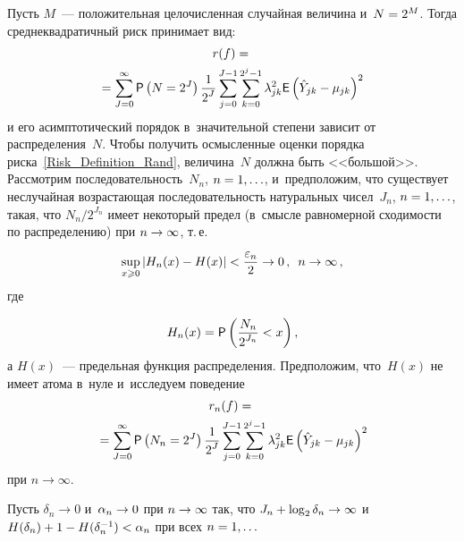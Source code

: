 \begin{multicols}{2}
Пусть $M$~--- положительная целочисленная случайная величина и~$N\hm=2^M$. 
Тогда среднеквадратичный риск принимает вид:
\begin{multline}
r(f)={}\\
\hspace*{-2mm}{}=\sum\limits_{J=0}^{\infty}{\sf P}\left(N=2^J\right)
\fr{1}{2^J}\sum\limits_{j=0}^{J-1}
\sumk\limits \lambda^2_{jk}{\sf E}\left(\hat{Y}_{jk}-\mujk\right)^2\!\!
\label{Risk_Definition_Rand}
\end{multline}
и его асимптотический порядок в~значительной степени зависит от распределения~$N$. 
Чтобы получить осмысленные оценки порядка риска~\eqref{Risk_Definition_Rand}, 
величина~$N$ должна быть <<большой>>. Рассмотрим последовательность~$N_n$, 
$n\hm=1,\ldots$,  и~предположим, что существует неслучайная возрастающая 
последовательность натуральных чисел~$J_n$, $n\hm=1,\ldots$, такая, что 
$N_n/2^{J_n}$ имеет некоторый предел 
(в~смысле равномерной сходимости по распределению) при $n\hm\to\infty$, т.\,е.
\begin{equation}
\label{converge}
\sup\limits_{x\geqslant0}\left\vert H_n(x)-H(x)\right\vert<\displaystyle\frac{\displaystyle \varepsilon_n\mathstrut}{\displaystyle 2\mathstrut}\to 0\,, \enskip
n\to\infty\,,
\end{equation}
где

\noindent
\begin{equation*}
H_n(x)={\sf P}\left(\displaystyle\frac{\displaystyle N_n\mathstrut}{\displaystyle 2^{J_n}\mathstrut}<x\right),
\end{equation*}
а $H(x)$~--- предельная функция распределения. Предположим, что~$H(x)$ не 
имеет атома в~нуле и~исследуем поведение
\begin{multline*}
r_n(f)={}\\
{}=\sum\limits_{J=0}^{\infty}{\sf P}
\left(N_n=2^J\right)\displaystyle\frac{\displaystyle 1\mathstrut}{\displaystyle 2^J\mathstrut}\sum\limits_{j=0}^{J-1}\sum\limits_{k=0}^{2^j-1}\limits \lambda^2_{jk}
{\sf E}\left(\hat{Y}_{jk}-\mu_{jk}\right)^2
\end{multline*}
при $n\to\infty$.

Пусть $\delta_n\to0$ и~$\alpha_n\hm\to0$ при $n\hm\to\infty$ так, что 
$J_n\hm+\log_2\delta_n\hm\to\infty$ и~$H(\delta_n)\hm+1\hm-H(\delta^{-1}_n)\hm<\alpha_n$ 
при всех $n\hm=1,\ldots$


\end{multicols}
